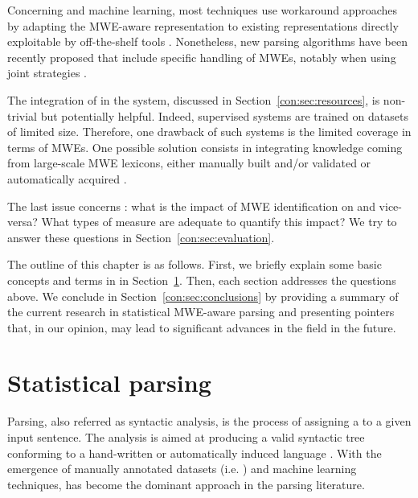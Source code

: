 \documentclass[output=paper]{langsci/langscibook}
\begin{document}
Concerning  and machine learning, most techniques use worka\-round approaches by adapting the MWE-aware representation to existing representations directly exploitable by off-the-shelf tools \citep{nasretal15}. Nonetheless, new parsing algorithms have been recently proposed that include specific handling of MWEs, notably when using joint strategies \citep{nivre:2014}. 

The integration of  in the system, discussed in  Section~\ref{con:sec:resources}, is non-trivial but potentially helpful. Indeed, supervised systems are trained on datasets of limited size. Therefore, one drawback of such systems is the limited coverage in terms of MWEs. One possible solution consists in integrating knowledge coming from large-scale MWE lexicons, either manually built and/or validated \citep{candito2014strategies} or automatically acquired \citep{schneider:2012}.

The last issue concerns : what is the impact of MWE identification on  and vice-versa? What types of measure are adequate to quantify this impact? We try to answer these questions in Section~\ref{con:sec:evaluation}.


The outline of this chapter is as follows. First, we briefly explain some basic concepts and terms in  in Section~\ref{con:sec:parsing}. Then, each section addresses the questions above. We conclude in Section~\ref{con:sec:conclusions} by providing a summary of the current research in statistical MWE-aware parsing and presenting pointers that, in our opinion, may lead to significant advances in the field in the future.



%
\section{Statistical parsing}
\label{con:sec:parsing}

Parsing, also referred as syntactic analysis, is the process of assigning a  to a given input sentence.
The analysis is aimed at producing a valid syntactic tree conforming to a hand-written or automatically induced language .
With the emergence of manually annotated datasets (i.e. ) and machine learning techniques,
 \citep{collins1996new,charniak2000maximum} has become the dominant approach in the parsing literature. 
\end{document}
